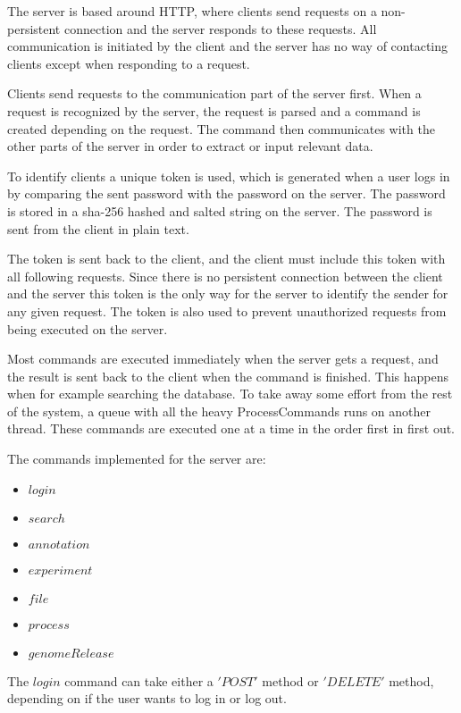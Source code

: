 \label{chap:com_systemdesign}
The server is based around HTTP, where clients send requests on a non-persistent connection and the server responds to these requests. All communication is initiated by the client and the server has no way of contacting clients except when responding to a request.

Clients send requests to the communication part of the server first. When a request is recognized by the server, the request is parsed and a command is created depending on the request. The command then communicates with the other parts of the server in order to extract or input relevant data.

To identify clients a unique token is used, which is generated when a user logs in by comparing the sent password with the password on the server. The password is stored in a sha-256 hashed and salted string on the server. The password is sent from the client in plain text.

The token is sent back to the client, and the client must include this token with all following requests. Since there is no persistent connection between the client and the server this token is the only way for the server to identify the sender for any given request. The token is also used to prevent unauthorized requests from being executed on the server.

Most commands are executed immediately when the server gets a request, and the result is sent back to the client when the command is finished. This happens when for example searching the database. To take away some effort from the rest of the system, a queue with all the heavy ProcessCommands runs on another thread. These commands are executed one at a time in the order first in first out.

The commands implemented for the server are:

\begin{itemize}
	\item $login$
	\item $search$
	\item $annotation$
	\item $experiment$
	\item $file$
	\item $process$
	\item $genomeRelease$
\end{itemize}

The $login$ command can take either a $'POST'$ method or $'DELETE'$ method, depending on if the user wants to log in or log out.

